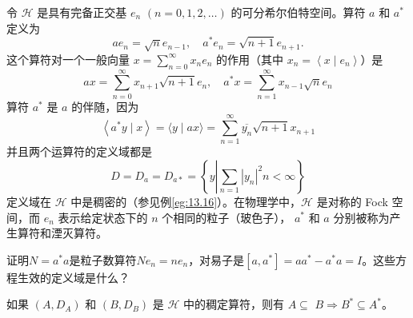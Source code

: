 \begin{eg}
    令 \(\mathcal{H}\) 是具有完备正交基 \(e_{n}\) \((n=0,1,2, \ldots)\) 的可分希尔伯特空间。算符 \(a\) 和 \(a^{*}\) 定义为
\[
a e_{n}=\sqrt{n} e_{n-1}, \quad a^{*} e_{n}=\sqrt{n+1} e_{n+1} .
\]
这个算符对一个一般向量 \(x=\sum_{n=0}^{\infty} x_{n} e_{n}\) 的作用（其中 \(x_{n}=\left\langle x \mid e_{ n}\right\rangle\)）是
\[
a x=\sum_{n=0}^{\infty} x_{n+1} \sqrt{n+1} e_{n}, \quad a^{*} x=\sum_{n=1}^{\infty} x_{n-1} \sqrt{n} e_{n}
\]
算符 \(a^{*}\) 是 \(a\) 的伴随，因为
\[
\left\langle a^{*} y \mid x\right\rangle=\langle y \mid a x\rangle=\sum_{n=1}^{\infty} \overline{y_{n}} \sqrt{n+1} x_{n+1}
\]
并且两个运算符的定义域都是
\[
D=D_{a}=D_{a *}=\left\{y\left|\sum_{n=1}\right.\left| y_{n}\right|^{2}n<\infty\right\}
\]
定义域在 \(\mathcal{H}\) 中是稠密的（参见例\ref{eg:13.16}）。在物理学中，\(\mathcal{H}\) 是对称的 Fock 空间，而 \(e_{n}\) 表示给定状态下的 \(n\) 个相同的粒子（玻色子）， \(a^{ *}\) 和 \(a\) 分别被称为产生算符和湮灭算符。
\end{eg}
\begin{exercise}
    证明\(N=a^{*} a\)是粒子数算符\(N e_{n}=n e_{n}\)，对易子是\(\left[a, a^{ *}\right]=a a^{*}-a^{*} a=I\)。这些方程生效的定义域是什么？
\end{exercise}
\begin{theorem}
    如果 \(\left(A, D_{A}\right)\) 和 \(\left(B, D_{B}\right)\) 是 \(\mathcal{H}\) 中的稠定算符，则有 \(A \subseteq\) \(B \Longrightarrow B^{*} \subseteq A^{*}\)。
\end{theorem}
